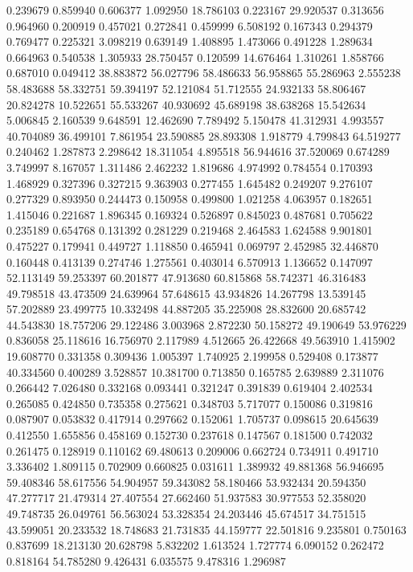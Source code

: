 0.239679
0.859940
0.606377
1.092950
18.786103
0.223167
29.920537
0.313656
0.964960
0.200919
0.457021
0.272841
0.459999
6.508192
0.167343
0.294379
0.769477
0.225321
3.098219
0.639149
1.408895
1.473066
0.491228
1.289634
0.664963
0.540538
1.305933
28.750457
0.120599
14.676464
1.310261
1.858766
0.687010
0.049412
38.883872
56.027796
58.486633
56.958865
55.286963
2.555238
58.483688
58.332751
59.394197
52.121084
51.712555
24.932133
58.806467
20.824278
10.522651
55.533267
40.930692
45.689198
38.638268
15.542634
5.006845
2.160539
9.648591
12.462690
7.789492
5.150478
41.312931
4.993557
40.704089
36.499101
7.861954
23.590885
28.893308
1.918779
4.799843
64.519277
0.240462
1.287873
2.298642
18.311054
4.895518
56.944616
37.520069
0.674289
3.749997
8.167057
1.311486
2.462232
1.819686
4.974992
0.784554
0.170393
1.468929
0.327396
0.327215
9.363903
0.277455
1.645482
0.249207
9.276107
0.277329
0.893950
0.244473
0.150958
0.499800
1.021258
4.063957
0.182651
1.415046
0.221687
1.896345
0.169324
0.526897
0.845023
0.487681
0.705622
0.235189
0.654768
0.131392
0.281229
0.219468
2.464583
1.624588
9.901801
0.475227
0.179941
0.449727
1.118850
0.465941
0.069797
2.452985
32.446870
0.160448
0.413139
0.274746
1.275561
0.403014
6.570913
1.136652
0.147097
52.113149
59.253397
60.201877
47.913680
60.815868
58.742371
46.316483
49.798518
43.473509
24.639964
57.648615
43.934826
14.267798
13.539145
57.202889
23.499775
10.332498
44.887205
35.225908
28.832600
20.685742
44.543830
18.757206
29.122486
3.003968
2.872230
50.158272
49.190649
53.976229
0.836058
25.118616
16.756970
2.117989
4.512665
26.422668
49.563910
1.415902
19.608770
0.331358
0.309436
1.005397
1.740925
2.199958
0.529408
0.173877
40.334560
0.400289
3.528857
10.381700
0.713850
0.165785
2.639889
2.311076
0.266442
7.026480
0.332168
0.093441
0.321247
0.391839
0.619404
2.402534
0.265085
0.424850
0.735358
0.275621
0.348703
5.717077
0.150086
0.319816
0.087907
0.053832
0.417914
0.297662
0.152061
1.705737
0.098615
20.645639
0.412550
1.655856
0.458169
0.152730
0.237618
0.147567
0.181500
0.742032
0.261475
0.128919
0.110162
69.480613
0.209006
0.662724
0.734911
0.491710
3.336402
1.809115
0.702909
0.660825
0.031611
1.389932
49.881368
56.946695
59.408346
58.617556
54.904957
59.343082
58.180466
53.932434
20.594350
47.277717
21.479314
27.407554
27.662460
51.937583
30.977553
52.358020
49.748735
26.049761
56.563024
53.328354
24.203446
45.674517
34.751515
43.599051
20.233532
18.748683
21.731835
44.159777
22.501816
9.235801
0.750163
0.837699
18.213130
20.628798
5.832202
1.613524
1.727774
6.090152
0.262472
0.818164
54.785280
9.426431
6.035575
9.478316
1.296987
